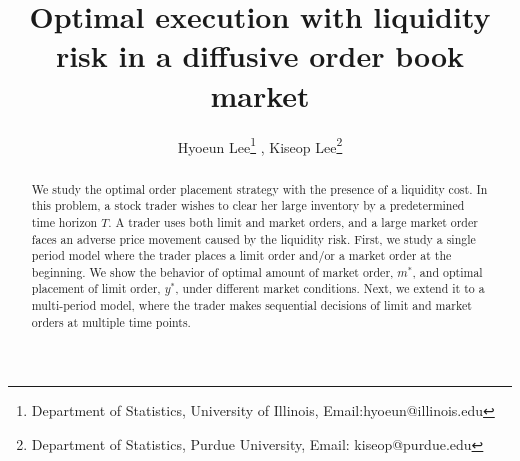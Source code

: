 \documentclass[11pt]{article}
\theoremstyle{plain}
\numberwithin{equation}{section}
\begin{document}
\title{Optimal execution with liquidity risk in a diffusive order book market}

\author{ Hyoeun Lee\footnote{Department of Statistics, University of Illinois, Email:hyoeun@illinois.edu}
,\,\,Kiseop Lee\footnote{Department of Statistics, Purdue University, Email: kiseop@purdue.edu}
}
\maketitle

\begin{abstract}

We study the optimal order placement strategy with the presence of a liquidity cost. In this problem, a stock trader wishes to clear her large inventory by a predetermined time horizon $T$. A trader uses both limit and market orders, and a large market order faces an adverse price movement caused by the liquidity risk. First, we study a single period model where the trader places a limit order and/or a market order at the beginning. We show the behavior of optimal amount of market order, $m^*$, and optimal placement of limit order, $y^*$, under different market conditions. Next, we extend it to a multi-period model, where the trader makes sequential decisions of limit and market orders at multiple time points.
\end{abstract}
\end{document}
